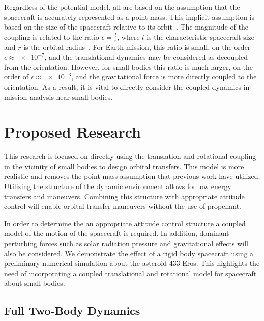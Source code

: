 \documentclass[11pt]{article} %
\begin{document}
Regardless of the potential model, all are based on the assumption that the spacecraft is accurately represented as a point mass.
This implicit assumption is based on the size of the spacecraft relative to its orbit~\cite{hughes2004}.
The magnitude of the coupling is related to the ratio \( \epsilon = \frac{l}{r} \), where \( l \) is the characteristic spacecraft size and \( r \) is the orbital radius~\cite{sincarsin1983}. 
For Earth mission, this ratio is small, on the order \( \epsilon \approx \num{e-7}\), and the translational dynamics may be considered as decoupled from the orientation.
However, for small bodies this ratio is much larger, on the order of \( \epsilon \approx \num{e-3}\), and the gravitational force is more directly coupled to the orientation.
As a result, it is vital to directly consider the coupled dynamics in mission analysis near small bodies.

\section{Proposed Research}
This research is focused on directly using the translation and rotational coupling in the vicinity of small bodies to design orbital transfers.
This model is more realistic and removes the point mass assumption that previous work have utilized. 
Utilizing the structure of the dynamic environment allows for low energy transfers and maneuvers.
Combining this structure with appropriate attitude control will enable orbital transfer maneuvers without the use of propellant.

In order to determine the an appropriate attitude control structure a coupled model of the motion of the spacecraft is required.
In addition, dominant perturbing forces such as solar radiation pressure and gravitational effects will also be considered. 
We demonstrate the effect of a rigid body spacecraft using a preliminary numerical simulation about the asteroid 433 Eros.
This highlights the need of incorporating a coupled translational and rotational model for spacecraft about small bodies.

\subsection{Full Two-Body Dynamics}
\end{document}
